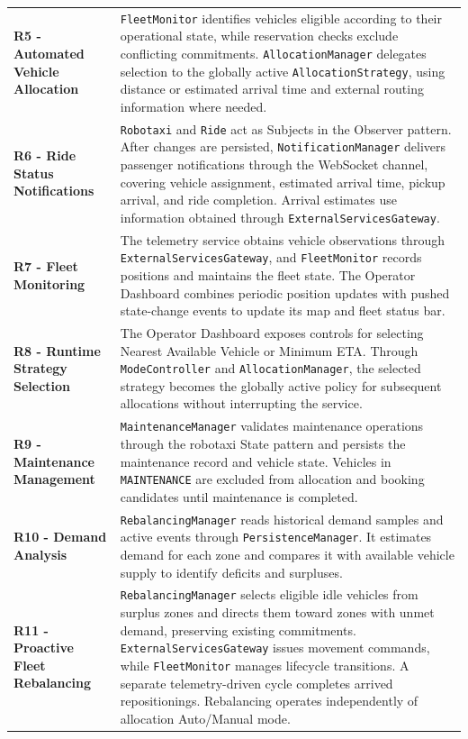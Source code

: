 \documentclass[11pt,a4paper,oneside]{report}
\newcommand{\code}[1]{\texttt{#1}}
\begin{document}
\begin{longtable}{@{}
    >{\raggedright\arraybackslash}p{}
    >{\raggedright\arraybackslash}p{}
@{}}
\textbf{R5 - Automated Vehicle Allocation}
&
\code{FleetMonitor} identifies vehicles eligible according to their
operational state, while reservation checks exclude conflicting
commitments. \code{AllocationManager} delegates selection to the
globally active \code{AllocationStrategy}, using distance or estimated
arrival time and external routing information where needed.
\\

\textbf{R6 - Ride Status Notifications}
&
\code{Robotaxi} and \code{Ride} act as Subjects in the Observer pattern.
After changes are persisted, \code{NotificationManager} delivers
passenger notifications through the WebSocket channel, covering
vehicle assignment, estimated arrival time, pickup arrival, and ride
completion. Arrival estimates use information obtained through
\code{ExternalServicesGateway}.
\\

\textbf{R7 - Fleet Monitoring}
&
The telemetry service obtains vehicle observations through
\code{ExternalServicesGateway}, and \code{FleetMonitor} records
positions and maintains the fleet state. The Operator Dashboard combines
periodic position updates with pushed state-change events to update
its map and fleet status bar.
\\

\textbf{R8 - Runtime Strategy Selection}
&
The Operator Dashboard exposes controls for selecting Nearest Available
Vehicle or Minimum ETA. Through \code{ModeController} and
\code{AllocationManager}, the selected strategy becomes the globally
active policy for subsequent allocations without interrupting the
service.
\\

\textbf{R9 - Maintenance Management}
&
\code{MaintenanceManager} validates maintenance operations through the
robotaxi State pattern and persists the maintenance record and vehicle
state. Vehicles in \code{MAINTENANCE} are excluded from allocation and
booking candidates until maintenance is completed.
\\

\textbf{R10 - Demand Analysis}
&
\code{RebalancingManager} reads historical demand samples and active
events through \code{PersistenceManager}. It estimates demand for each
zone and compares it with available vehicle supply to identify
deficits and surpluses.
\\

\textbf{R11 - Proactive Fleet Rebalancing}
&
\code{RebalancingManager} selects eligible idle vehicles from surplus
zones and directs them toward zones with unmet demand, preserving
existing commitments. \code{ExternalServicesGateway} issues movement
commands, while \code{FleetMonitor} manages lifecycle transitions.
A separate telemetry-driven cycle completes arrived repositionings.
Rebalancing operates independently of allocation Auto/Manual mode.
\\


\end{longtable}
\end{document}
